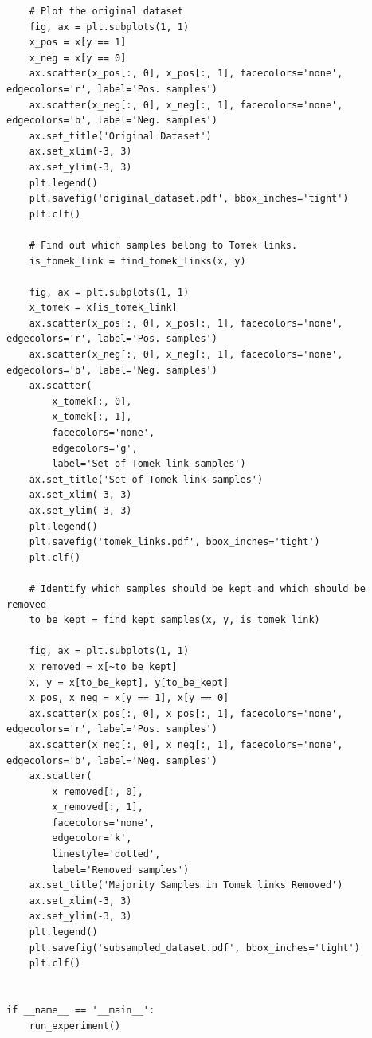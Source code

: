 \documentclass[a4paper]{article}
\begin{document}
{\begin{enumerate}
\begin{lstlisting}
    # Plot the original dataset
    fig, ax = plt.subplots(1, 1)
    x_pos = x[y == 1]
    x_neg = x[y == 0]
    ax.scatter(x_pos[:, 0], x_pos[:, 1], facecolors='none', edgecolors='r', label='Pos. samples')
    ax.scatter(x_neg[:, 0], x_neg[:, 1], facecolors='none', edgecolors='b', label='Neg. samples')
    ax.set_title('Original Dataset')
    ax.set_xlim(-3, 3)
    ax.set_ylim(-3, 3)
    plt.legend()
    plt.savefig('original_dataset.pdf', bbox_inches='tight')
    plt.clf()

    # Find out which samples belong to Tomek links.
    is_tomek_link = find_tomek_links(x, y)

    fig, ax = plt.subplots(1, 1)
    x_tomek = x[is_tomek_link]
    ax.scatter(x_pos[:, 0], x_pos[:, 1], facecolors='none', edgecolors='r', label='Pos. samples')
    ax.scatter(x_neg[:, 0], x_neg[:, 1], facecolors='none', edgecolors='b', label='Neg. samples')
    ax.scatter(
        x_tomek[:, 0],
        x_tomek[:, 1],
        facecolors='none',
        edgecolors='g',
        label='Set of Tomek-link samples')
    ax.set_title('Set of Tomek-link samples')
    ax.set_xlim(-3, 3)
    ax.set_ylim(-3, 3)
    plt.legend()
    plt.savefig('tomek_links.pdf', bbox_inches='tight')
    plt.clf()

    # Identify which samples should be kept and which should be removed
    to_be_kept = find_kept_samples(x, y, is_tomek_link)

    fig, ax = plt.subplots(1, 1)
    x_removed = x[~to_be_kept]
    x, y = x[to_be_kept], y[to_be_kept]
    x_pos, x_neg = x[y == 1], x[y == 0]
    ax.scatter(x_pos[:, 0], x_pos[:, 1], facecolors='none', edgecolors='r', label='Pos. samples')
    ax.scatter(x_neg[:, 0], x_neg[:, 1], facecolors='none', edgecolors='b', label='Neg. samples')
    ax.scatter(
        x_removed[:, 0],
        x_removed[:, 1],
        facecolors='none',
        edgecolor='k',
        linestyle='dotted',
        label='Removed samples')
    ax.set_title('Majority Samples in Tomek links Removed')
    ax.set_xlim(-3, 3)
    ax.set_ylim(-3, 3)
    plt.legend()
    plt.savefig('subsampled_dataset.pdf', bbox_inches='tight')
    plt.clf()


if __name__ == '__main__':
    run_experiment()
\end{lstlisting}


\end{enumerate}}
\end{document}
